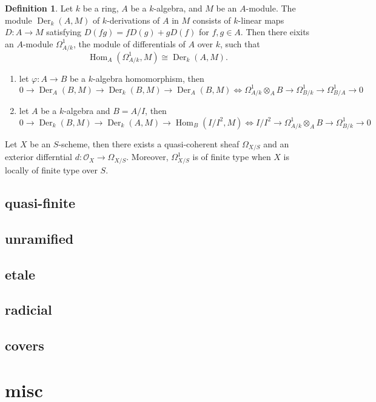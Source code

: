 \documentclass[leqno]{amsart}
\DeclareMathOperator{\Der}{Der}
\newcommand{\oo}{\mathcal O}
\newcommand{\1}{\mathbf{1}}
\DeclareMathOperator{\Hom}{Hom}
\theoremstyle{definition}
\newtheorem{defn}[thm]{Definition}
\theoremstyle{remark}
\begin{document}
\begin{defn}
	Let $k$ be a ring, $A$ be a $k$-algebra,
	and $M$ be an  $A$-module.
	The module $\Der_k(A,M)$ of $k$-derivations of  $A$ in  $M$
	consists of $k$-linear maps $D\colon A\to M$
	satisfying $D(fg)=fD(g)+gD(f)$ for  $f,g\in A$.
	Then there eixits an  $A$-module  $\Omega^1_{A/k}$,
	the module of differentials of $A$ over  $k$,
	such that 
	 \[
		 \Hom_A(\Omega^1_{A/k},M)\cong \Der_k(A,M).
	\]
\end{defn}
\begin{enumerate}[label=(\alph*)]
	\item let $\varphi\colon A\to B$ be a 
		$k$-algebra homomorphism, then
		\[
		0\to \Der_A(B,M)\to \Der_k(B,M)\to \Der_A(B,M)
		\Longleftrightarrow
		\Omega^1_{A/k}\otimes_AB\to \Omega^1_{B/k}
		\to \Omega^1_{B/A}\to 0
		\]
	\item let $A$ be a  $k$-algebra and  $B=A/I$, then
		 \[
		 0\to \Der_k(B,M)\to \Der_k(A,M)\to\Hom_B(I/I^2,M)
		 \Longleftrightarrow
		 I/I^2\to \Omega^1_{A/k}\otimes_AB\to 
		 \Omega^1_{B/k}\to 0
		\]
\end{enumerate}

Let $X$ be an  $S$-scheme,
then there exists a quasi-coherent sheaf
$\Omega_{X/S}$ and an exterior differntial
$d\colon \oo_X\to \Omega_{X/S}$.
Moreover, $\Omega^1_{X/S}$ is of finite type
when $X$ is locally of finite type over  $S$.

\subsection{quasi-finite}
\subsection{unramified}
\subsection{etale}
\subsection{radicial}
\subsection{covers}

\section{misc}
\end{document}
